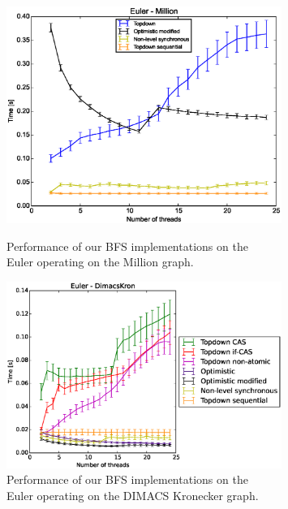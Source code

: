 \documentclass[letterpaper]{article}
\begin{document}
		\begin{figure}
			\centering
			\begin{minipage}{.5\textwidth}
				\centering
	  			\includegraphics[width=0.8\textwidth]{euler_million.eps}
	  			\vspace*{-0.3cm}
	  			\caption[caption]{Performance of our BFS implementations on the \\ \hspace{\textwidth} Euler operating on the Million graph.\label{fig:eulerbig}}
			\end{minipage}%
			\begin{minipage}{.5\textwidth}
				\centering
	  			\includegraphics[width=0.8\textwidth]{euler_dimacskron.eps}
	  			\vspace*{-0.3cm}
	  			\caption[caption]{Performance of our BFS implementations on the \\ \hspace{\textwidth} Euler operating on the DIMACS Kronecker graph.\label{fig:eulerkron}}
			\end{minipage}%
		\end{figure}
\end{document}
